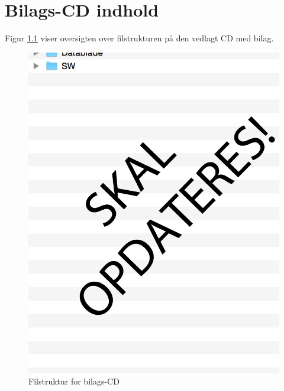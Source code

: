 \chapter{Bilags-CD indhold}

Figur \ref{fig:Bilags_CD} viser oversigten over filstrukturen på den vedlagt CD med bilag.

\begin{figure}[H]
  \centering
    \includegraphics[height=0.7\textheight]{billeder/bilagscd}
    \caption{Filstruktur for bilags-CD}
    \label{fig:Bilags_CD}
\end{figure}